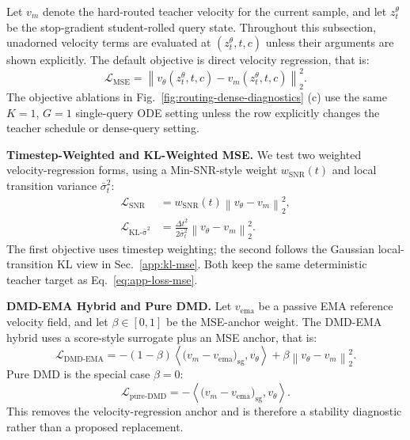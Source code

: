 \documentclass{llmxive}
\begin{document}
Let $v_m$ denote the hard-routed teacher velocity for the current sample, and let $z_t^\theta$ be the stop-gradient student-rolled query state. Throughout this subsection, unadorned velocity terms are evaluated at $(z_t^\theta,t,c)$ unless their arguments are shown explicitly. The default objective is direct velocity regression, that is:
\begin{equation}
  \mathcal{L}_{\mathrm{MSE}}
  = \left\|v_\theta(z_t^\theta,t,c)-v_m(z_t^\theta,t,c)\right\|_2^2.
  \label{eq:app-loss-mse}
\end{equation}
The objective ablations in Fig.~\ref{fig:routing-dense-diagnostics} (c) use the same $K{=}1$, $G{=}1$ single-query ODE setting unless the row explicitly changes the teacher schedule or dense-query setting.

\noindent\textbf{Timestep-Weighted and KL-Weighted MSE.}
We test two weighted velocity-regression forms, using a Min-SNR-style weight $w_{\mathrm{SNR}}(t)$ and local transition variance $\bar{\sigma}_t^2$:
\begin{align}
  \mathcal{L}_{\mathrm{SNR}}
  &= w_{\mathrm{SNR}}(t)
  \left\|v_\theta-v_m\right\|_2^2,\\
  \mathcal{L}_{\mathrm{KL\text{-}\bar{\sigma}^2}}
  &= \frac{\Delta t^2}{2\bar{\sigma}_t^2}
  \left\|v_\theta-v_m\right\|_2^2.
  \label{eq:app-loss-weighted-mse}
\end{align}
The first objective uses timestep weighting; the second follows the Gaussian local-transition KL view in Sec.~\ref{app:kl-mse}. Both keep the same deterministic teacher target as Eq.~\eqref{eq:app-loss-mse}.

\noindent\textbf{DMD-EMA Hybrid and Pure DMD.}
Let $v_{\mathrm{ema}}$ be a passive EMA reference velocity field, and let $\beta\in[0,1]$ be the MSE-anchor weight. The DMD-EMA hybrid uses a score-style surrogate plus an MSE anchor, that is:
\begin{equation}
  \mathcal{L}_{\mathrm{DMD\text{-}EMA}}
  =-(1-\beta)\left\langle \bigl(v_m-v_{\mathrm{ema}}\bigr)_{\mathrm{sg}},v_\theta\right\rangle
  +\beta\left\|v_\theta-v_m\right\|_2^2.
  \label{eq:app-loss-dmd-ema}
\end{equation}
Pure DMD is the special case $\beta=0$:
\begin{equation}
  \mathcal{L}_{\mathrm{pure\text{-}DMD}}
  =-\left\langle \bigl(v_m-v_{\mathrm{ema}}\bigr)_{\mathrm{sg}},v_\theta\right\rangle.
  \label{eq:app-loss-pure-dmd}
\end{equation}
This removes the velocity-regression anchor and is therefore a stability diagnostic rather than a proposed replacement.
\end{document}
